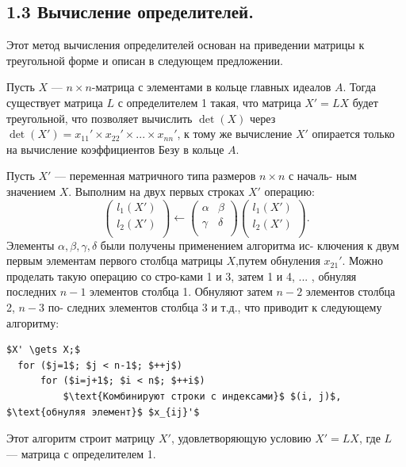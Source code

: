 \subsection{1.3 Вычисление определителей.}
Этот метод вычисления определителей основан на приведении матрицы \linebreak к треугольной форме и описан в следующем предложении.  
\begin{predl} 
Пусть $X$ --- $n \times n$-матрица с элементами в кольце главных идеалов \linebreak $A$. Тогда существует матрица $L$ с определителем 1 такая, что матрица \linebreak $X' = LX$ будет треугольной, что позволяет вычислить $\det(X)$ через \linebreak $\det(X') = {x_{11}}' \times {x_{22}}' \times ... \times {x_{nn}}' $, к тому же вычисление $X'$ опирается  \linebreak только на вычисление коэффициентов Безу в кольце $A$.
\end{predl}
\begin{myproof}
Пусть $X'$ --- переменная матричного типа размеров $n \times n$ с началь- \linebreak ным значением $X$. Выполним на двух первых строках $X'$ операцию:  
$${\left( \begin{array}{ccc}
l_1(X') \\
l_2(X') \\
\end{array} \right)}\gets {\left( \begin{array}{ccc}
\alpha & \beta \\
\gamma & \delta \\
\end{array} \right)}{\left( \begin{array}{ccc}
l_1(X') \\
l_2(X') \\
\end{array} \right)}.$$
\newpage
\noindent Элементы $\alpha, \beta, \gamma, \delta$ были получены применением алгоритма ис- \linebreak ключения к двум первым элементам первого столбца матрицы $X$,\linebreak путем обнуления ${x_{21}}'$. Можно проделать такую операцию со стро-\linebreak ками 1 и 3, затем 1 и 4, ... , обнуляя последних $n - 1$ элементов \linebreak столбца 1. Обнуляют затем $n - 2$ элементов столбца 2, $n - 3$ по- \linebreak следних элементов столбца 3 и т.д., что приводит к следующему \linebreak алгоритму:  
\begin{lstlisting}[mathescape=true]
  $X' \gets X;$
  for ($j=1$; $j < n-1$; $++j$) 
      for ($i=j+1$; $i < n$; $++i$)  
          $\text{Комбинируют строки с индексами}$ $(i, j)$, $\text{обнуляя элемент}$ $x_{ij}'$
\end{lstlisting}
Этот алгоритм строит матрицу $X'$, удовлетворяющую условию $X' = LX$, где $L$ --- матрица с определителем 1.
\end{myproof}
